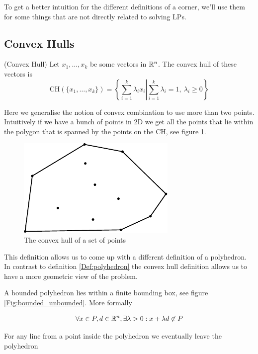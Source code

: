 To get a better intuition for the different definitions of a corner, we'll use them for some things that are not directly related to solving LPs.

\subsection*{Convex Hulls}

\begin{Def}(Convex Hull) Let $x_1,\ldots,x_k$ be some vectors in $\mathbb{R}^n$. The convex hull of these vectors is
\[\mbox{CH}(\{x_1,\ldots,x_k\}) = \left\{\sum _{i=1}^k \lambda_i x_i \left| \sum_{i=1}^k \lambda_i =1,\ \lambda_i\geq 0\right.\right\}\]
\end{Def}

Here we generalise the notion of convex combination to use more than two points. Intuitively if we have a bunch of points in 2D we get all the points that lie within the polygon that is spanned by the points on the CH, see figure \ref{Fig:convexHull}.

\begin{figure}[hbt]
\begin{center}
\includegraphics{./images/convex_hull.pdf}
\end{center}
\caption{The convex hull of a set of points}
\label{Fig:convexHull}
\end{figure}

This definition allows us to come up with a different definition of a polyhedron. In contrast to definition \ref{Def:polyhedron} the convex hull definition allows us to have a more geometric view of the problem.

\begin{Def} A bounded polyhedron lies within a finite bounding box, see figure \ref{Fig:bounded_unbounded}. More formally

\[\forall x\in P,d\in \mathbb{R}^n, \exists \lambda > 0: x+\lambda d \not \in P\]

For any line from a point inside the polyhedron we eventually leave the polyhedron
\end{Def}

